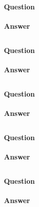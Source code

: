 \documentclass[12pt,letterpaper]{article}
\begin{document}
\paragraph{Question}
\paragraph{Answer}

\subsection{}
\paragraph{Question}
\paragraph{Answer}

\subsection{}
\paragraph{Question}
\paragraph{Answer}

\subsection{}
\paragraph{Question}
\paragraph{Answer}

\subsection{}
\paragraph{Question}
\paragraph{Answer}
\end{document}
